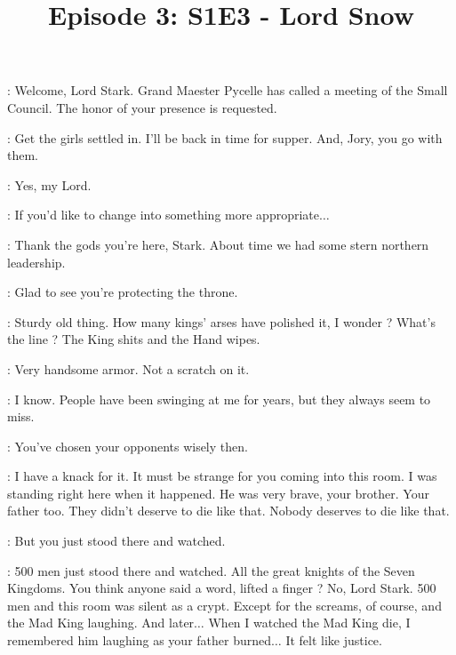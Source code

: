 

\title{Episode 3: S1E3 - Lord Snow}
\author{}
\date{}
\maketitle



\scene



\PAGE: Welcome, Lord Stark. Grand Maester Pycelle has called a meeting of the Small Council. The honor of your presence is requested. 

\NED: Get the girls settled in. I'll be back in time for supper. And, Jory, you go with them. 

\JORY: Yes, my Lord. 

\PAGE: If you'd like to change into something more appropriate$\ldots$ 

\scene



\JAIME: Thank the gods you're here, Stark. About time we had some stern northern leadership. 

\NED: Glad to see you're protecting the throne. 

\JAIME: Sturdy old thing. How many kings' arses have polished it, I wonder ? What's the line ? The King shits and the Hand wipes. 

\NED: Very handsome armor. Not a scratch on it. 

\JAIME: I know. People have been swinging at me for years, but they always seem to miss. 

\NED: You've chosen your opponents wisely then. 

\JAIME: I have a knack for it. It must be strange for you coming into this room. I was standing right here when it happened. He was very brave, your brother. Your father too. They didn't deserve to die like that. Nobody deserves to die like that. 

\NED: But you just stood there and watched. 

\JAIME: 500 men just stood there and watched. All the great knights of the Seven Kingdoms. You think anyone said a word, lifted a finger ? No, Lord Stark. 500 men and this room was silent as a crypt. Except for the screams, of course, and the Mad King laughing. And later$\ldots$ When I watched the Mad King die, I remembered him laughing as your father burned$\ldots$ It felt like justice. 

